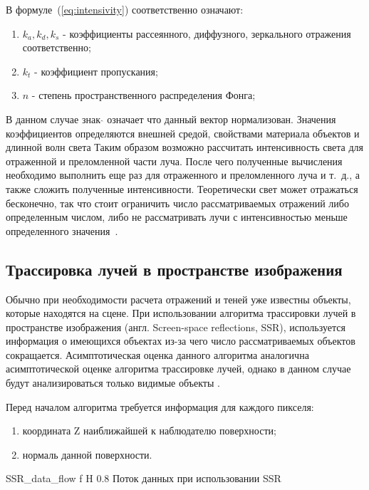 В формуле~(\ref{eq:intensivity}) соответственно означают:
\begin{enumerate}
	\item $k_a,k_d,k_s$ - коэффициенты рассеянного, диффузного, зеркального отражения соответственно;
	\item $k_t$ - коэффициент пропускания;
	\item $n$ - степень пространственного распределения Фонга;
\end{enumerate}
В данном случае знак $ \hat{} $  означает что данный вектор нормализован.
Значения коэффициентов определяются внешней средой, свойствами материала объектов и длинной волн света
Таким образом возможно рассчитать интенсивность света для отраженной и преломленной части луча.
После чего полученные вычисления необходимо выполнить еще раз для отраженного и преломленного луча и т.~д., а также сложить полученные интенсивности.
Теоретически свет может отражаться бесконечно, так что стоит ограничить число рассматриваемых отражений либо определенным числом,
либо не рассматривать лучи с интенсивностью меньше определенного значения~\cite{Rodgers}.





\subsection{Трассировка лучей в пространстве изображения}
Обычно при необходимости расчета отражений и теней уже известны объекты, которые находятся на сцене. При использовании алгоритма трассировки лучей в пространстве изображения (англ. Screen-space reflections, SSR), используется информация о имеющихся
объектах из-за чего число рассматриваемых объектов сокращается.
Асимптотическая оценка данного алгоритма аналогична асимптотической оценке алгоритма трассировке лучей, однако в данном случае будут анализироваться только видимые объекты \cite{SSR}.

Перед началом алгоритма требуется информация для каждого пикселя:
\begin{enumerate}
	\item координата Z наиближайшей к наблюдателю поверхности;
	\item нормаль данной поверхности.
\end{enumerate}



{SSR_data_flow} %
{f} %
{H} %
{0.8\textwidth} %
{Поток данных при использовании SSR} %



